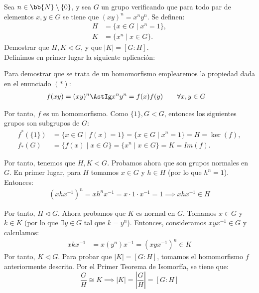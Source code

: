 \begin{ejercicio}
    Sea $n\in \bb{N}\setminus \{0\}$, y sea $G$ un grupo verificando que para todo par de elementos $x,y\in G$ se tiene que $(xy)^n=x^ny^n$. Se definen:
    \begin{align*}
        H &= \{x\in G\mid x^n=1\},\\
        K &= \{x^n\mid x\in G\}.
    \end{align*}
    Demostrar que $H,K\lhd G$, y que $|K|=[G:H]$.\\

    Definimos en primer lugar la siguiente aplicación:

    Para demostrar que se trata de un homomorfismo emplearemos la propiedad dada en el enunciado $(\ast)$:
    \begin{align*}
        f(xy) &= (xy)^n \AstIg x^ny^n = f(x)f(y)\qquad \forall x,y\in G
    \end{align*}

    Por tanto, $f$ es un homomorfismo. Como $\{1\},G<G$, entonces los siguientes grupos son subgrupos de $G$:
    \begin{align*}
        f^*(\{1\}) &= \{x\in G\mid f(x)=1\} = \{x\in G\mid x^n=1\} = H = \ker(f),\\
        f_*(G) &= \{f(x)\mid x\in G\} = \{x^n\mid x\in G\} = K = Im(f).
    \end{align*}

    Por tanto, tenemos que $H,K<G$. Probamos ahora que son grupos normales en $G$. En primer lugar, para $H$ tomamos $x\in G$ y $h\in H$ (por lo que $h^n=1$). Entonces:
    \begin{align*}
        (xhx^{-1})^n = xh^nx^{-1} = x\cdot 1\cdot x^{-1} = 1 \implies xhx^{-1}\in H
    \end{align*}

    Por tanto, $H\lhd G$. Ahora probamos que $K$ es normal en $G$. Tomamos $x\in G$ y $k\in K$ (por lo que $\exists y\in G$ tal que $k=y^n$). Entonces, consideramos $xyx^{-1}\in G$ y calculamos:
    \begin{align*}
        xkx^{-1} &= x(y^n)x^{-1} = (xyx^{-1})^n \in K
    \end{align*}
    Por tanto, $K\lhd G$. Para probar que $|K|=[G:H]$, tomamos el homomorfismo $f$ anteriormente descrito. Por el Primer Teorema de Isomorfía, se tiene que:
    \begin{equation*}
        \dfrac{G}{H}\cong K \implies |K| = \left|\dfrac{G}{H}\right| = [G:H]
    \end{equation*}
\end{ejercicio}

